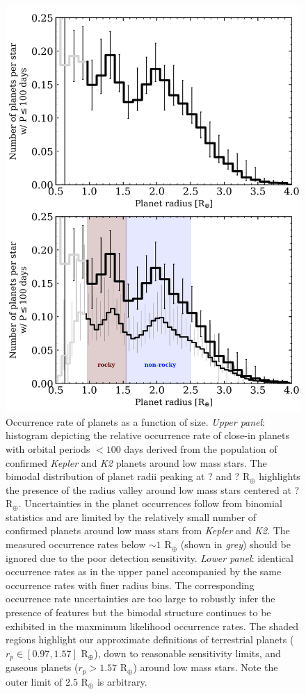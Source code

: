 \documentclass[twocolumn]{emulateapj}
\newcommand{\kepler}[1]{\emph{Kepler}#1}
\newcommand{\ktwo}[1]{\emph{K2}#1}
\begin{document}
  
\begin{figure}
  \centering
  \includegraphics[scale=.8]{figures/rphist_double.png}
  \caption{Occurrence rate of planets as a function of size. \emph{Upper panel}:
    histogram depicting the relative occurrence
    rate of close-in planets with orbital periods $<100$ days derived from the population of confirmed
    \kepler{} and \ktwo{} planets around low mass stars. The bimodal distribution of planet radii peaking
    at ? and ? R$_{\oplus}$ highlights the presence of the radius valley around low mass stars centered at ?
    R$_{\oplus}$. Uncertainties in the planet occurrences follow from binomial statistics and are limited by
    the relatively small number of confirmed planets around low mass stars from \kepler{} and \ktwo{.} 
    The measured occurrence rates below $\sim 1$ R$_{\oplus}$ (shown in \emph{grey}) should be ignored due to
    the poor detection sensitivity. \emph{Lower panel}: identical occurrence rates as in the upper panel 
    accompanied by the same occurrence rates with finer radius bins.
    The corresponding occurrence rate uncertainties
    are too large to robustly infer the presence of features but the bimodal structure continues
    to be exhibited in the maxmimum likelihood occurrence rates. The shaded regions highlight our approximate
    definitions of terrestrial planets ($r_p \in [0.97,1.57]$ R$_{\oplus}$), down to reasonable sensitivity limits,
    and gaseous planets ($r_p > 1.57$ R$_{\oplus}$) around low mass stars. Note the outer limit of 2.5 R$_{\oplus}$
    is arbitrary.}
  \label{fig:rphist}
\end{figure}
\end{document}
